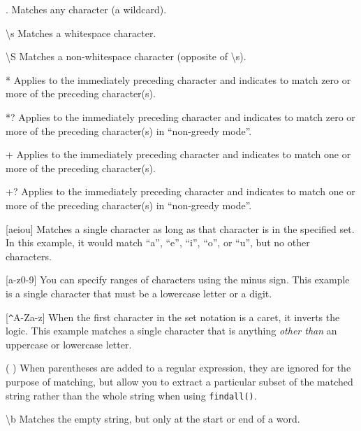 . \newline
Matches any character (a wildcard).

{\textbackslash}s \newline
Matches a whitespace character.

{\textbackslash}S \newline
Matches a non-whitespace character (opposite of {\textbackslash}s).

* \newline
Applies to the immediately preceding character and indicates to match zero or more of the
preceding character(s).

*? \newline
Applies to the immediately preceding character and indicates to match zero or more of the
preceding character(s) in ``non-greedy mode''.

+ \newline
Applies to the immediately preceding character and indicates to match one or more of the 
preceding character(s).

+? \newline
Applies to the immediately preceding character and indicates to match one or more of the 
preceding character(s) in ``non-greedy mode''.

[aeiou] \newline
Matches a single character as long as that character is in the specified set.  In this example,
it would match ``a'', ``e'', ``i'', ``o'', or ``u'', but no other characters.

[a-z0-9] \newline
You can specify ranges of characters using the minus sign.  This example is a single character
that must be a lowercase letter or a digit.

[\verb"^"A-Za-z] \newline
When the first character in the set notation is a caret, it inverts the logic.  This example
matches a single character that is anything {\em other than} an uppercase or lowercase letter.

( ) \newline
When parentheses are added to a regular expression, they are ignored for the purpose of matching,
but allow you to extract a particular subset of the matched string rather than the whole string
when using {\tt findall()}.

{\textbackslash}b \newline
Matches the empty string, but only at the start or end of a word.

